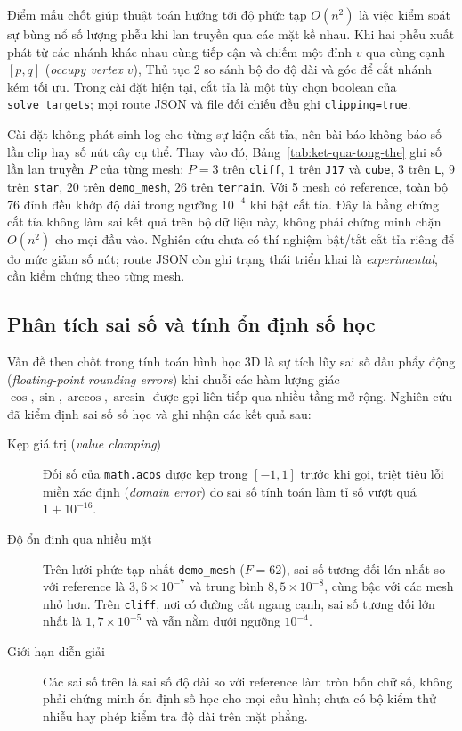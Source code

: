 Điểm mấu chốt giúp thuật toán hướng tới độ phức tạp $O(n^2)$ là việc kiểm soát
sự bùng nổ số lượng phễu khi lan truyền qua các mặt kề nhau. Khi hai phễu xuất
phát từ các nhánh khác nhau cùng tiếp cận và chiếm một đỉnh $v$ qua cùng cạnh
$[p,q]$ (\emph{occupy vertex $v$}), Thủ tục 2 so sánh bộ đo độ dài và góc để cắt
nhánh kém tối ưu. Trong cài đặt hiện tại, cắt tỉa là một tùy chọn boolean của
\texttt{solve\_targets}; mọi route JSON và file đối chiếu đều ghi
\texttt{clipping=true}.

Cài đặt không phát sinh log cho từng sự kiện cắt tỉa, nên bài báo không báo số
lần clip hay số nút cây cụ thể. Thay vào đó, Bảng~\ref{tab:ket-qua-tong-the} ghi
số lần lan truyền $P$ của từng mesh: $P=3$ trên \texttt{cliff}, $1$ trên
\texttt{J17} và \texttt{cube}, $3$ trên \texttt{L}, $9$ trên \texttt{star}, $20$
trên \texttt{demo\_mesh}, $26$ trên \texttt{terrain}. Với 5 mesh có reference,
toàn bộ 76 đỉnh đều khớp độ dài trong ngưỡng $10^{-4}$ khi bật cắt tỉa. Đây là
bằng chứng cắt tỉa không làm sai kết quả trên bộ dữ liệu này, không phải chứng
minh chặn $O(n^2)$ cho mọi đầu vào. Nghiên cứu chưa có thí nghiệm bật/tắt cắt tỉa
riêng để đo mức giảm số nút; route JSON còn ghi trạng thái triển khai là
\emph{experimental}, cần kiểm chứng theo từng mesh.

\subsection{Phân tích sai số và tính ổn định số học}

Vấn đề then chốt trong tính toán hình học 3D là sự tích lũy sai số dấu phẩy động
(\emph{floating-point rounding errors}) khi chuỗi các hàm lượng giác
$\cos,\sin,\arccos,\arcsin$ được gọi liên tiếp qua nhiều tầng mở rộng. Nghiên cứu
đã kiểm định sai số số học và ghi nhận các kết quả sau:
\begin{description}
  \item[Kẹp giá trị (\emph{value clamping})] Đối số của \texttt{math.acos} được
    kẹp trong $[-1,1]$ trước khi gọi, triệt tiêu lỗi miền xác định
    (\emph{domain error}) do sai số tính toán làm tỉ số vượt quá $1+10^{-16}$.
  \item[Độ ổn định qua nhiều mặt] Trên lưới phức tạp nhất \texttt{demo\_mesh}
    ($F=62$), sai số tương đối lớn nhất so với reference là
    $3{,}6\times10^{-7}$ và trung bình $8{,}5\times10^{-8}$, cùng bậc với các
    mesh nhỏ hơn. Trên \texttt{cliff}, nơi có đường cắt ngang cạnh, sai số tương
    đối lớn nhất là $1{,}7\times10^{-5}$ và vẫn nằm dưới ngưỡng $10^{-4}$.
  \item[Giới hạn diễn giải] Các sai số trên là sai số độ dài so với reference làm
    tròn bốn chữ số, không phải chứng minh ổn định số học cho mọi cấu hình; chưa có bộ
    kiểm thử nhiễu hay phép kiểm tra độ dài trên mặt phẳng.
\end{description}

